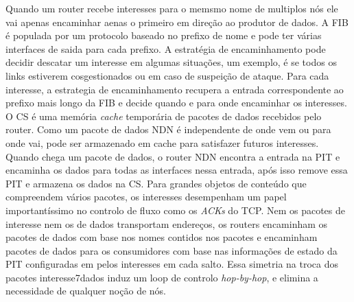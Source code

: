 Quando um router recebe interesses para o memsmo nome de multiplos nós ele vai apenas encaminhar aenas o primeiro em direção ao produtor de dados. A \gls{FIB} é populada por um protocolo baseado no prefixo de nome e pode ter várias interfaces de saida para cada prefixo. A estratégia de encaminhamento pode decidir descatar um interesse em algumas situações, um exemplo, é se todos os links estiverem cosgestionados ou em caso de suspeição de ataque. Para cada interesse, a estrategia de encaminhamento recupera a entrada correspondente ao prefixo mais longo da \gls{FIB} e decide quando e para onde encaminhar os interesses. O \gls{CS} é uma memória \textit{cache} temporária de pacotes de dados recebidos pelo router. Como um pacote de dados \gls{NDN} é independente de onde vem ou para onde vai, pode ser armazenado em cache para satisfazer futuros interesses. Quando chega um pacote de dados, o router \gls{NDN} encontra a entrada na \gls{PIT} e encaminha os dados para todas as interfaces nessa entrada, após isso remove essa \gls{PIT} e armazena os dados na \gls{CS}. Para grandes objetos de conteúdo que compreendem vários pacotes, os interesses desempenham um papel importantíssimo no controlo de fluxo como os \textit{ACKs} do TCP. Nem os pacotes de interesse nem os de dados transportam endereços, os routers encaminham os pacotes de dados com base nos nomes contidos nos pacotes e encaminham pacotes de dados para os consumidores com base nas informações de estado da \gls{PIT} configuradas em pelos interesses em cada salto. Essa simetria na troca dos pacotes interesse7dados induz um loop de controlo \textit{hop-by-hop}, e elimina a necessidade de qualquer noção de nós.

